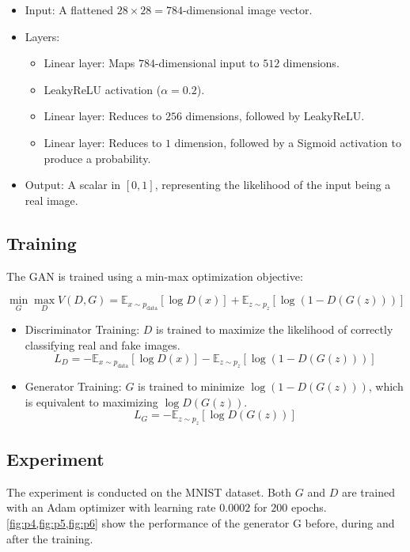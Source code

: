 \documentclass[12pt]{article}
\begin{document}
\begin{itemize}
    \item Input: A flattened \(28\times28 = 784\)-dimensional image vector.
    \item Layers:
        \begin{itemize}
            \item Linear layer: Maps \(784\)-dimensional input to \(512\) dimensions.
            \item LeakyReLU activation (\(\alpha=0.2\)).
            \item Linear layer: Reduces to \(256\) dimensions, followed by LeakyReLU.
            \item Linear layer: Reduces to \(1\) dimension, followed by a Sigmoid activation to produce a probability.
        \end{itemize}
    \item Output: A scalar in \([0, 1]\), representing the likelihood of the input being a real image.
\end{itemize}

\subsection{Training}

The GAN is trained using a min-max optimization objective:

\[
\min_{G} \max_{D} V(D, G) = \mathbb{E}_{x \sim p_{\text{data}}}[\log D(x)] + \mathbb{E}_{z \sim p_z}[\log(1 - D(G(z)))]
\]

\begin{itemize}
    \item Discriminator Training: \(D\) is trained to maximize the likelihood of correctly classifying real and fake images.
  \[
  L_D = - \mathbb{E}_{x \sim p_{\text{data}}}[\log D(x)] - \mathbb{E}_{z \sim p_z}[\log(1 - D(G(z)))]
  \]
    \item Generator Training: \(G\) is trained to minimize \(\log(1 - D(G(z)))\), which is equivalent to maximizing \(\log D(G(z))\).
  \[
  L_G = - \mathbb{E}_{z \sim p_z}[\log D(G(z))]
  \]
\end{itemize}

\subsection{Experiment}

The experiment is conducted on the MNIST dataset. Both \(G\) and \(D\) are trained with an Adam optimizer with learning rate \(0.0002\) for \(200\) epochs. \cref{fig:p4,fig:p5,fig:p6} show the performance of the generator G before, during and after the training.
\end{document}
